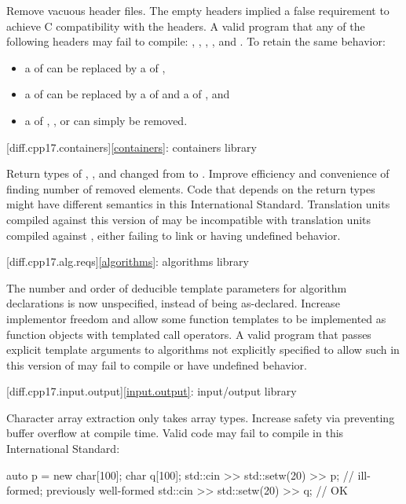 \change
Remove vacuous \Cpp{} header files.
\rationale
The empty headers implied a false requirement to achieve C compatibility with the \Cpp{} headers.
\effect
A valid \CppXVII{} program that  any of the following headers may fail to compile:
,
,
,
, and
.
To retain the same behavior:
\begin{itemize}
\item
a  of  can be replaced by
a  of ,
\item
a  of  can be replaced by
a  of  and
a  of ,
and
\item
a  of
,
, or
can simply be removed.
\end{itemize}

[diff.cpp17.containers]{\ref{containers}: containers library}

\change
Return types of , , and 
changed from  to .
\rationale
Improve efficiency and convenience of finding number of removed elements.
\effect
Code that depends on the return types might have different semantics in this International Standard.
Translation units compiled against this version of \Cpp{} may be incompatible with
translation units compiled against \CppXVII{}, either failing to link or having undefined behavior.

[diff.cpp17.alg.reqs]{\ref{algorithms}: algorithms library}

\change
The number and order of deducible template parameters for algorithm declarations
is now unspecified, instead of being as-declared.
\rationale
Increase implementor freedom and allow some function templates
to be implemented as function objects with templated call operators.
\effect
A valid \CppXVII{} program that passes explicit template arguments to
algorithms not explicitly specified to allow such in this version of \Cpp{}
may fail to compile or have undefined behavior.

[diff.cpp17.input.output]{\ref{input.output}: input/output library}

\change
Character array extraction only takes array types.
\rationale
Increase safety via preventing buffer overflow at compile time.
\effect
Valid \CppXVII{} code may fail to compile in this International Standard:
\begin{codeblock}
auto p = new char[100];
char q[100];
std::cin >> std::setw(20) >> p;        // ill-formed; previously well-formed
std::cin >> std::setw(20) >> q;        // OK
\end{codeblock}

